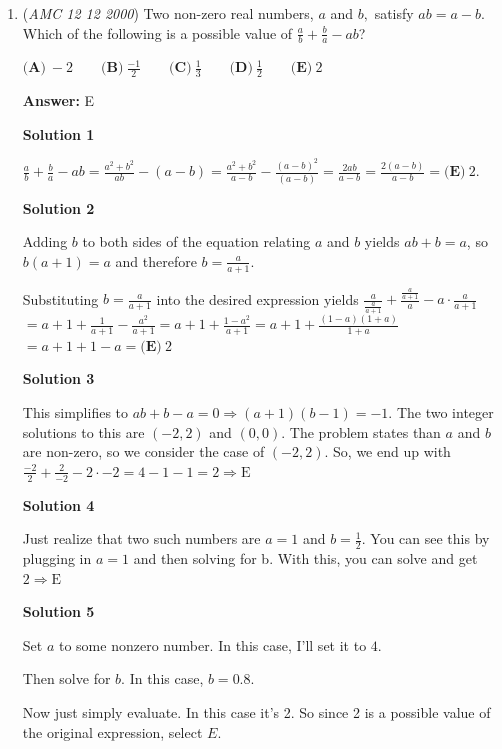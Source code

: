 \begin{enumerate}
	\item (\textit{AMC 12 12 2000}) Two non-zero real numbers, $a$ and $b,$ satisfy $ab = a - b$. Which of the following is a possible value of $\frac {a}{b} + \frac {b}{a} - ab$?


 $\textbf{(A)} \ - 2 \qquad \textbf{(B)} \ \frac {- 1}{2} \qquad \textbf{(C)} \ \frac {1}{3} \qquad \textbf{(D)} \ \frac {1}{2} \qquad \textbf{(E)} \ 2$

 \textbf{Answer: }E



\textbf{Solution 1}

$\frac {a}{b} + \frac {b}{a} - ab = \frac{a^2 + b^2}{ab} - (a - b) = \frac{a^2 + b^2}{a-b} - \frac{(a-b)^2}{(a-b)} = \frac{2ab}{a-b} = \frac{2(a-b)}{a-b} =\boxed{\textbf{(E)}\ 2}$. 

 



\textbf{Solution 2}

Adding $b$ to both sides of the equation relating $a$ and $b$ yields $ab + b = a$, so $b(a+1) = a$ and therefore $b = \frac{a}{a+1}$.  

 Substituting $b=\frac{a}{a+1}$ into the desired expression yields $\frac{a}{\frac{a}{a+1}} + \frac{\frac{a}{a+1}}{a} - a \cdot{\frac{a}{a+1}}$ $= a+1+\frac{1}{a+1}-\frac{a^2}{a+1} = a+1+\frac{1-a^2}{a+1} = a+1+\frac{(1-a)(1+a)}{1+a}$ $=a+1+1-a=\boxed{\textbf{(E)}\ 2}$




\textbf{Solution 3}

This simplifies to $ab+b-a=0 \Rightarrow (a+1)(b-1) = -1$. The two integer solutions to this are $(-2,2)$ and $(0,0)$. The problem states than $a$ and $b$ are non-zero, so we consider the case of $(-2,2)$. So, we end up with $\frac{-2}{2} + \frac{2}{-2} - 2 \cdot -2 = 4 - 1 - 1 = 2 \Rightarrow \boxed{\text{E}}$




\textbf{Solution 4}

Just realize that two such numbers are $a = 1$ and $b = \frac{1}{2}$. You can see this by plugging in $a = 1$ and then solving for b. With this, you can solve and get $2 \Rightarrow\boxed{\text{E}}$




\textbf{Solution 5}

Set $a$ to some nonzero number. In this case, I'll set it to $4$. 

 Then solve for $b$. In this case, $b=0.8$. 

 Now just simply evaluate. In this case it's 2. So since 2 is a possible value of the original expression, select $\boxed{E}$.


\end{enumerate}
